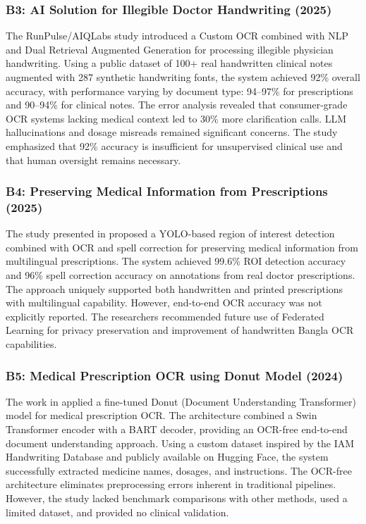 \documentclass[conference]{IEEEtran}
\begin{document}
\subsubsection{B3: AI Solution for Illegible Doctor Handwriting (2025)}

The RunPulse/AIQLabs study \cite{priya2026medicalocr} introduced a Custom OCR combined with NLP and Dual Retrieval Augmented Generation for processing illegible physician handwriting. Using a public dataset of 100+ real handwritten clinical notes augmented with 287 synthetic handwriting fonts, the system achieved 92\% overall accuracy, with performance varying by document type: 94--97\% for prescriptions and 90--94\% for clinical notes. The error analysis revealed that consumer-grade OCR systems lacking medical context led to 30\% more clarification calls. LLM hallucinations and dosage misreads remained significant concerns. The study emphasized that 92\% accuracy is insufficient for unsupervised clinical use and that human oversight remains necessary.

\subsubsection{B4: Preserving Medical Information from Prescriptions (2025)}

The study presented in \cite{babu2024aidriven} proposed a YOLO-based region of interest detection combined with OCR and spell correction for preserving medical information from multilingual prescriptions. The system achieved 99.6\% ROI detection accuracy and 96\% spell correction accuracy on annotations from real doctor prescriptions. The approach uniquely supported both handwritten and printed prescriptions with multilingual capability. However, end-to-end OCR accuracy was not explicitly reported. The researchers recommended future use of Federated Learning for privacy preservation and improvement of handwritten Bangla OCR capabilities.

\subsubsection{B5: Medical Prescription OCR using Donut Model (2024)}

The work in \cite{devi2026endtoend} applied a fine-tuned Donut (Document Understanding Transformer) model for medical prescription OCR. The architecture combined a Swin Transformer encoder with a BART decoder, providing an OCR-free end-to-end document understanding approach. Using a custom dataset inspired by the IAM Handwriting Database and publicly available on Hugging Face, the system successfully extracted medicine names, dosages, and instructions. The OCR-free architecture eliminates preprocessing errors inherent in traditional pipelines. However, the study lacked benchmark comparisons with other methods, used a limited dataset, and provided no clinical validation.
\end{document}
